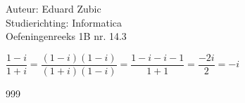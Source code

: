 \documentclass[a4paper]{article}
\begin{document}
  
\noindent \large Auteur: Eduard Zubic \\
\noindent \large Studierichting: Informatica\\
\noindent \large Oefeningenreeks 1B nr. 14.3\\

\medskip

\normalsize

$\dfrac{1 - i}{1 + i} = \dfrac{(1 - i)(1 - i)}{(1 + i)(1 - i)} = \dfrac{1 - i - i - 1}{1 + 1} = \dfrac{-2i}{2} = -i$

\begin{thebibliography}{999}
\end{thebibliography}
\end{document}
